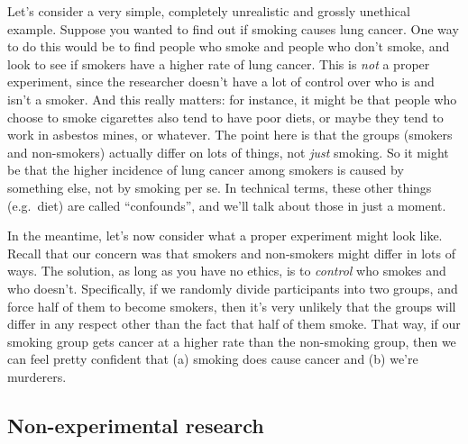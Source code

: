 \documentclass[
]{book}
\begin{document}
Let's consider a very simple, completely unrealistic and grossly unethical example. Suppose you wanted to find out if smoking causes lung cancer. One way to do this would be to find people who smoke and people who don't smoke, and look to see if smokers have a higher rate of lung cancer. This is {\emph{not}} a proper experiment, since the researcher doesn't have a lot of control over who is and isn't a smoker. And this really matters: for instance, it might be that people who choose to smoke cigarettes also tend to have poor diets, or maybe they tend to work in asbestos mines, or whatever. The point here is that the groups (smokers and non-smokers) actually differ on lots of things, not {\emph{just}} smoking. So it might be that the higher incidence of lung cancer among smokers is caused by something else, not by smoking per se. In technical terms, these other things (e.g.~diet) are called ``confounds'', and we'll talk about those in just a moment.

In the meantime, let's now consider what a proper experiment might look like. Recall that our concern was that smokers and non-smokers might differ in lots of ways. The solution, as long as you have no ethics, is to {\emph{control}} who smokes and who doesn't. Specifically, if we randomly divide participants into two groups, and force half of them to become smokers, then it's very unlikely that the groups will differ in any respect other than the fact that half of them smoke. That way, if our smoking group gets cancer at a higher rate than the non-smoking group, then we can feel pretty confident that (a) smoking does cause cancer and (b) we're murderers.

\hypertarget{non-experimental-research}{%
\subsection{Non-experimental research}\label{non-experimental-research}}
\end{document}
